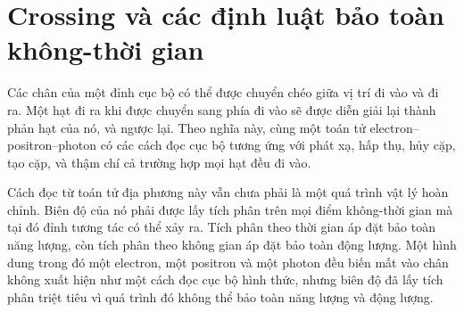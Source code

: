 \section{Crossing và các định luật bảo toàn không-thời gian}

Các chân của một đỉnh cục bộ có thể được chuyển chéo giữa vị trí đi vào và đi ra. Một hạt đi ra khi được chuyển sang phía đi vào sẽ được diễn giải lại thành phản hạt của nó, và ngược lại. Theo nghĩa này, cùng một toán tử electron--positron--photon có các cách đọc cục bộ tương ứng với phát xạ, hấp thụ, hủy cặp, tạo cặp, và thậm chí cả trường hợp mọi hạt đều đi vào.

\begin{classroomqa}
\end{classroomqa}

Cách đọc từ toán tử địa phương này vẫn chưa phải là một quá trình vật lý hoàn chỉnh. Biên độ của nó phải được lấy tích phân trên mọi điểm không-thời gian mà tại đó đỉnh tương tác có thể xảy ra. Tích phân theo thời gian áp đặt bảo toàn năng lượng, còn tích phân theo không gian áp đặt bảo toàn động lượng. Một hình dung trong đó một electron, một positron và một photon đều biến mất vào chân không xuất hiện như một cách đọc cục bộ hình thức, nhưng biên độ đã lấy tích phân triệt tiêu vì quá trình đó không thể bảo toàn năng lượng và động lượng.

\begin{classroomqa}
\end{classroomqa}

\begin{classroomqa}
\end{classroomqa}

